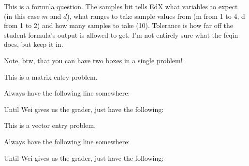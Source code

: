 This is a formula question.  The samples bit tells EdX what variables to expect (in this case $m$ and $d$),
what ranges to take sample values from (m from 1 to 4, d from 1 to 2) and how many samples to take (10).
Tolerance is how far off the student formula's output is allowed to get.  I'm not entirely sure
what the feqin does, but keep it in.  


Note, btw, that you can have two boxes in a single problem!


\edXsolution{ 

}

\endedxproblem



This is a matrix entry problem.


Always have the following line somewhere:




Until Wei gives us the grader, just have the following:





\edXsolution{ 
}


\endedxproblem



This is a vector entry problem.


Always have the following line somewhere:




Until Wei gives us the grader, just have the following:





\edXsolution{ 
}


\endedxproblem
